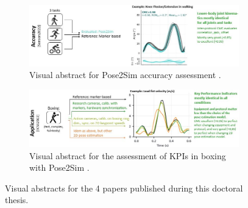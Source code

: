 \begin{figure}[hbtp]
\begin{subfigure}[b]{1\textwidth}
            \centering
            \def\svgwidth{1\columnwidth}
            \fontsize{10pt}{10pt}\selectfont
            \includegraphics[width=\linewidth]{"../Intro/Figures/Fig_VisAbstract3.JPG"}
            \caption{Visual abstract for Pose2Sim accuracy assessment \cite{Pagnon2022a}.}
            \label{fig_visabstract3_1}
	\end{subfigure}
      \vskip 1cm
	\begin{subfigure}[b]{1\textwidth}
            \centering
            \def\svgwidth{1\columnwidth}
            \fontsize{10pt}{10pt}\selectfont
            \includegraphics[width=\linewidth]{"../Intro/Figures/Fig_VisAbstract4.JPG"}
            \caption{Visual abstract for the assessment of KPIs in boxing with Pose2Sim \cite{Pagnon2022c}.}
            \label{fig_visabstract4_1}
	\end{subfigure}
	\caption{Visual abstracts for the 4 papers published during this doctoral thesis.}
	\label{fig_visabstract}
\end{figure}


